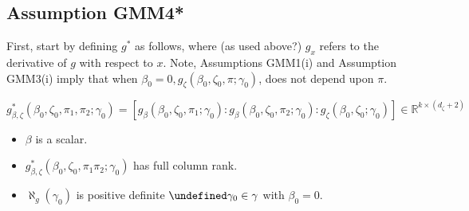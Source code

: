 \documentclass[11pt]{article}
\newcommand*{\R}{\mathbb{R}}
\let\oldforall\forall
\let\forall\undefined
\DeclareMathOperator{\forall}{\oldforall}
\begin{document}
\subsection{Assumption GMM4*}


First, start by defining $g^{*}$ as follows, where (as used above?) $g_{x}$ refers to the derivative of $g$ with
respect to $x$.
Note, Assumptions GMM1(i) and Assumption GMM3(i) imply that when $\beta_0 = 0, g_{\zeta}\left(\beta_0, \zeta_0,
\pi ; \gamma_0\right)$, does not depend upon $\pi$.

\begin{equation}
    g_{\beta, \zeta}^{*}\left(\beta_0, \zeta_0, \pi_1, \pi_2 ; \gamma_0\right)  = \left[g_{\beta}\left(\beta_0,
    \zeta_0, \pi_1 ; \gamma_0\right)  : g_{\beta}\left(\beta_0, \zeta_0, \pi_2 ; \gamma_0\right) : g_{\zeta}
    \left(\beta_0, \zeta_0 ; \gamma_0\right)  \right]  \in \R^{k \times (d_{\zeta} + 2)}
\end{equation}


\begin{itemize}
    \item $\beta$ is a scalar.
    \item $g_{\beta, \zeta}^{*}(\beta_0, \zeta_0, \pi_1 \pi_2 ; \gamma_0)$ has full column rank. 
    \item $\aleph_g(\gamma_0)$ is positive definite $\forall \gamma_0 \in \gamma $ with $\beta_0 = 0$. 
\end{itemize}






\printbibliography
\end{document}
